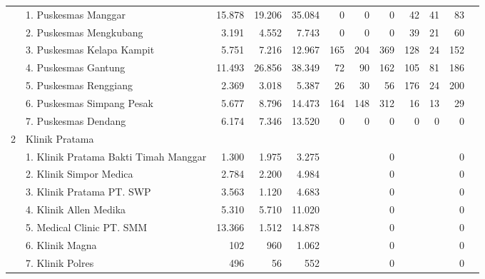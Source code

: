 {\begin{small}
\begin{tabular}{cY{30em}rrrrrrrrrr}
    & 1. Puskesmas Manggar                                 & 15.878 & 19.206 & 35.084 &   0 &   0 &   0 &  42 & 41 &  83 \\
    & 2. Puskesmas Mengkubang                              &  3.191 &  4.552 &  7.743 &   0 &   0 &   0 &  39 & 21 &  60 \\
    & 3. Puskesmas Kelapa Kampit                           &  5.751 &  7.216 & 12.967 & 165 & 204 & 369 & 128 & 24 & 152 \\
    & 4. Puskesmas Gantung                                 & 11.493 & 26.856 & 38.349 &  72 &  90 & 162 & 105 & 81 & 186 \\
    & 5. Puskesmas Renggiang                               &  2.369 &  3.018 &  5.387 &  26 &  30 &  56 & 176 & 24 & 200 \\
    & 6. Puskesmas Simpang Pesak                           &  5.677 &  8.796 & 14.473 & 164 & 148 & 312 &  16 & 13 &  29 \\
    & 7. Puskesmas Dendang                                 &  6.174 &  7.346 & 13.520 &   0 &   0 &   0 &   0 &  0 &   0 \\
    2 & Klinik Pratama & & & & & & & & & \\
    & 1. Klinik Pratama Bakti Timah Manggar                &  1.300 &  1.975 &  3.275 &     &     &   0 &     &    &   0 \\
	& 2. Klinik Simpor Medica                              &  2.784 &  2.200 &  4.984 &     &     &   0 &     &    &   0 \\
	& 3. Klinik Pratama PT. SWP                            &  3.563 &  1.120 &  4.683 &     &     &   0 &     &    &   0 \\
	& 4. Klinik Allen Medika                               &  5.310 &  5.710 & 11.020 &     &     &   0 &     &    &   0 \\
	& 5. Medical Clinic PT. SMM                            & 13.366 &  1.512 & 14.878 &     &     &   0 &     &    &   0 \\
	& 6. Klinik Magna                                      &    102 &    960 &  1.062 &     &     &   0 &     &    &   0 \\
	& 7. Klinik Polres                                     &    496 &     56 &    552 &     &     &   0 &     &    &   0 \\
    \end{tabular}%
    \end{small}

}


